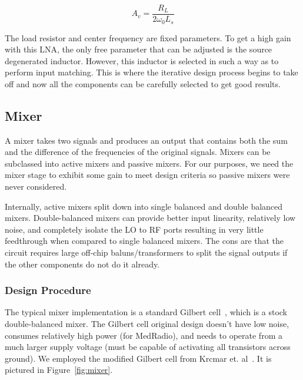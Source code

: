 \begin{equation} 
  	A_{v} = \frac{R_L}{2\omega_0L_s}
\end{equation}

The load resistor and center frequency are fixed parameters. To get a high gain with this LNA, the only free parameter that can be adjusted is the source degenerated inductor. However, this inductor is selected in such a way as to perform input matching. This is where the iterative design process begins to take off and now all the components can be carefully selected to get good results.

\subsection{Mixer}

A mixer takes two signals and produces an output that contains both the sum and the difference of the frequencies of the original signals. Mixers can be subclassed into active mixers and passive mixers. For our purposes, we need the mixer stage to exhibit some gain to meet design criteria so passive mixers were never considered. 

Internally, active mixers split down into single balanced and double balanced mixers. Double-balanced mixers can provide better input linearity, relatively low noise, and completely isolate the LO to RF ports resulting in very little feedthrough when compared to single balanced mixers. The cons are that the circuit requires large off-chip baluns/transformers to split the signal outputs if the other components do not do it already. 

\subsubsection{Design Procedure}
The typical mixer implementation is a standard Gilbert cell~\cite{gilbert}, which is a stock double-balanced mixer. The Gilbert cell original design doesn't have low noise, consumes relatively high power (for MedRadio), and needs to operate from a much larger supply voltage (must be capable of activating all transistors across ground). We employed the modified Gilbert cell from Krcmar et. al~\cite{krcmar1}. It is pictured in Figure~\ref{fig:mixer}. 

